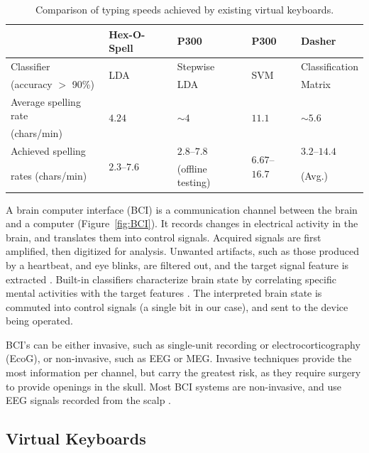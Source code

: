 \documentclass[12pt,titlepage]{article}
\begin{document}
\begin{table}
\caption{Comparison of typing speeds achieved by existing virtual keyboards.}
\begin{center}
\begin{tabular}{lllll}
\hline\hline
& Hex-O-Spell & P300 & P300 & Dasher\\
\hline
Classifier & \multirow{2}{*}{LDA} & Stepwise & \multirow{2}{*}{SVM} & Classification \\
\quad (accuracy $>$ 90\%) & & LDA  & & Matrix \\
Average spelling rate & \multirow{2}{*}{$4.24$} & \multirow{2}{*}{$\sim4$} & \multirow{2}{*}{$11.1$} & \multirow{2}{*}{$\sim5.6$} \\
\quad (chars/min) & & & & \\
Achieved spelling & \multirow{2}{*}{$2.3$--$7.6$} & $2.8$--$7.8$ & \multirow{2}{*}{$6.67$--$16.7$} & $3.2$--$14.4$ \\
\quad rates (chars/min) & & (offline testing) & & (Avg.) \\
\hline\hline
\end{tabular}
\end{center}
\label{table:BCIComp}
\end{table}

A brain computer interface (BCI) is a communication channel between the brain and a 
computer (Figure~\ref{fig:BCI}). It records changes in electrical activity in the brain, and translates them into 
control signals.  Acquired signals are first amplified, then digitized for analysis.  Unwanted 
artifacts, such as those produced by a heartbeat, and eye blinks, are filtered out, and the target signal
feature is extracted \cite{lotte_review_2007}.   Built-in classifiers characterize brain state by correlating specific mental 
activities with the target features \cite{lotte_review_2007}.  The interpreted brain state is commuted into control signals (a single bit in our case), and sent to the device being operated.

BCI's can be either invasive, such as single-unit recording or electrocorticography (EcoG), or 
non-invasive, such as EEG or MEG.  Invasive techniques provide the most information per 
channel, but carry the greatest risk, as they require surgery to provide openings in the skull. 
Most BCI systems are non-invasive, and use EEG signals recorded from the scalp \cite{guger_design_1999}.

\subsection{Virtual Keyboards} %
\end{document}
